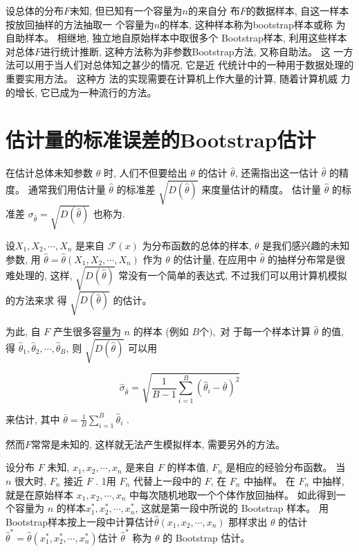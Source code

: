 设总体的分布$F$未知, 但已知有一个容量为$n$的来自分
布$F$的数据样本, 自这一样本按放回抽样的方法抽取一
个容量为$n$的样本, 这种样本称为bootstrap样本或称
为自助样本。 相继地, 独立地自原始样本中取很多个
Bootstrap样本, 利用这些样本对总体$F$进行统计推断, 
这种方法称为非参数Bootstrap方法, 又称自助法。 这
一方法可以用于当人们对总体知之甚少的情况, 它是近
代统计中的一种用于数据处理的重要实用方法。 这种方
法的实现需要在计算机上作大量的计算, 随着计算机威
力的增长, 它已成为一种流行的方法。 

\section{估计量的标准误差的Bootstrap估计}

在估计总体未知参数 $ \theta $ 时, 人们不但要给出 $ \theta $ 的估计 $ \hat{\theta} $, 还需指出这一估计 $ \hat{\theta} $ 的精度。 通常我们用估计量 $ \hat{\theta} $
的标准差 $ \sqrt{D(\hat{\theta})} $ 来度量估计的精度。 估计量 $ \hat{\theta} $ 的标准差 $ \sigma_{\hat{\theta}}=\sqrt{D(\hat{\theta})} $ 也称为. 

设$ {X}_{1}, {X}_{2}, \cdots, X_{n} $ 是来自 $ \mathcal{F}(x) $ 为分布函数的总体的样本, $ \theta $ 是我们感兴趣的未知参数, 用 $ \hat{{\theta}}=\hat{{\theta}}\left({X}_{1}, {X}_{2}, \cdots, {X}_{n}\right) $ 作为 $ \theta $ 的估计量, 在应用中 $ \hat{\theta} $ 的抽样分布常是很难处理的, 这样, $ \sqrt{D(\hat{\theta})} $ 常没有一个简单的表达式, 不过我们可以用计算机模拟的方法来求 得 $ \sqrt{D(\hat{\theta})} $ 的估计。 

为此, 自 $ {F} $ 产生很多容量为 $ {n} $ 的样本 (例如 $ {B 个 ) ,} $ 对 于每一个样本计算 $ \hat{\theta} $ 的值, 得 $ \hat{\theta}_{1}, \hat{\theta}_{2}, \cdots, \hat{\theta}_{B} $, 则 $ \sqrt{D(\hat{\theta})} $ 可以用

$$ \hat{\sigma}_{\hat{\theta}}=\sqrt{\frac{1}{B-1} \sum_{i=1}^{B}\left(\hat{\theta}_{i}-\bar{\theta}\right)^{2}} $$

来估计, 其中 $ \bar{\theta}=\frac{1}{B} \sum_{i=1}^{B} \hat{\theta}_{i} $ . 

然而$F$常常是未知的, 这样就无法产生模拟样本, 需要另外的方法。 

设分布 $ F $ 未知, $ x_{1}, x_{2}, \cdots, x_{n} $ 是来自 $ F $ 的样本值, $ {F}_{n} $ 是相应的经验分布函数。 当 $ n $ 很大时, $ F_{n} $ 接近 $ F $ . 1用 $ F_{n} $ 代替上一段中的 $ F $, 在 $ F_{n} $ 中抽样。 在 $ F_{n} $ 中抽样, 就是在原始样本 $ {x}_{1}, {x}_{2}, \cdots, {x}_{n} $ 中每次随机地取一个个体作放回抽样。 如此得到一个容量为 $ {n} $ 的样本$ {x}_{1}^{*}, {x}_{2}^{*}, \cdots, {x}_{n}^{*} $, 这就是第一段中所说的 Bootstrap 样本。 用Bootstrap样本按上一段中计算估计$ \hat{\theta}\left(x_{1}, x_{2}, \cdots, x_{n}\right) $ 那样求出 $ \theta $ 的估计 $ \hat{\theta}^{*}=\hat{\theta}\left(x_{1}^{*}, x_{2}^{*}, \cdots, x_{n}^{*}\right) $估计 $ \hat{\theta}^{*} $ 称为 $ \theta $ 的 Bootstrap 估计。 



